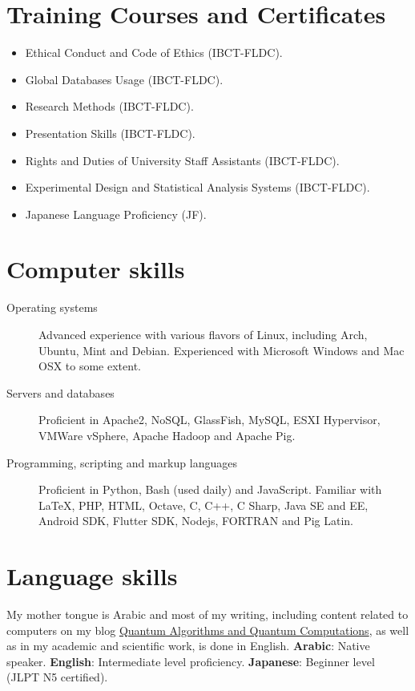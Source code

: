 \documentclass[margin,line]{resume}
\begin{document}
\begin{resume}
	\section{Training Courses and Certificates\mysidestyle}
	\begin{itemize}

		\item Ethical Conduct and Code of Ethics (IBCT-FLDC).
		\item Global Databases Usage (IBCT-FLDC).
		\item Research Methods (IBCT-FLDC).
		\item Presentation Skills (IBCT-FLDC).
		\item Rights and Duties of University Staff Assistants (IBCT-FLDC).
		\item Experimental Design and Statistical Analysis Systems (IBCT-FLDC).
		\item Japanese Language Proficiency (JF).

	\end{itemize}




	\section{Computer skills\mysidestyle}\vspace{1mm}
	\begin{description}
		\item[Operating systems] Advanced experience with various flavors of Linux, including Arch, Ubuntu, Mint and Debian. Experienced with Microsoft Windows and Mac OSX to some extent.
		\item[Servers and databases] Proficient in Apache2, NoSQL, GlassFish, MySQL, ESXI Hypervisor, VMWare vSphere, Apache Hadoop and Apache Pig.
		\item[Programming, scripting and markup languages] Proficient in Python, Bash (used daily) and JavaScript. Familiar with \LaTeX, PHP, HTML, Octave, C, C++, C Sharp, Java SE and EE, Android SDK, Flutter SDK, Nodejs, FORTRAN and Pig Latin.
	\end{description}


	\section{Language skills\mysidestyle}\vspace{1mm}
	My mother tongue is Arabic and most of my writing, including content related to computers on my blog  \href{https://qaqcblog.quora.com/}{Quantum Algorithms and Quantum Computations}, as well as in my academic and scientific work, is done in English.
	\textbf{Arabic}: Native speaker.
	\textbf{English}: Intermediate level proficiency.
	\textbf{Japanese}: Beginner level (JLPT N5 certified).

\end{resume}
\end{document}

